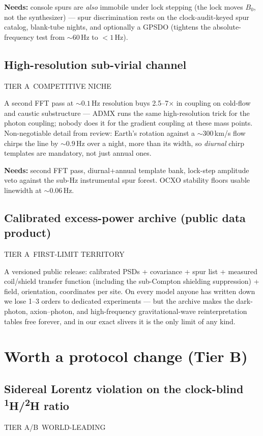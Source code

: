\documentclass[11pt]{article}
\newcommand{\chip}[3]{\colorbox{#1}{\textcolor{#2}{\scriptsize\textsf{\vphantom{Ag}#3}}}}
\newcommand{\cworld}[1]{\chip{goldsoft}{goldink}{#1}}
\newcommand{\cniche}[1]{\chip{accentsoft}{accentink}{#1}}
\newcommand{\cfirst}[1]{\chip{gatesoft}{gateink}{#1}}
\newcommand{\ctier}[1]{\chip{numbg}{inkfaint}{#1}}
\newcommand{\needs}[1]{{\small\textcolor{inkfaint}{\textbf{Needs:} #1}}}
\newcommand{\hnmr}{\textsuperscript{1}H}
\newcommand{\dnmr}{\textsuperscript{2}H}
\begin{document}
\needs{console spurs are \emph{also} immobile under lock stepping (the lock
moves $B_0$, not the synthesizer) --- spur discrimination rests on the
clock-audit-keyed spur catalog, blank-tube nights, and optionally a GPSDO
(tightens the absolute-frequency test from ${\sim}60$\,Hz to $<1$\,Hz).}

\subsection{High-resolution sub-virial channel}
\ctier{TIER A}\ \cniche{COMPETITIVE NICHE}

\medskip\noindent
A second FFT pass at ${\sim}0.1$\,Hz resolution buys 2.5--7$\times$ in coupling
on cold-flow and caustic substructure --- ADMX runs the same high-resolution
trick for the photon coupling; nobody does it for the gradient coupling at these
mass points. Non-negotiable detail from review: Earth's rotation against a
${\sim}300$\,km/s flow chirps the line by ${\sim}0.9$\,Hz over a night, more
than its width, so \emph{diurnal} chirp templates are mandatory, not just annual
ones.

\smallskip
\needs{second FFT pass, diurnal+annual template bank, lock-step amplitude veto
against the sub-Hz instrumental spur forest. OCXO stability floors usable
linewidth at ${\sim}0.06$\,Hz.}

\subsection{Calibrated excess-power archive (public data product)}
\ctier{TIER A}\ \cfirst{FIRST-LIMIT TERRITORY}

\medskip\noindent
A versioned public release: calibrated PSDs + covariance + spur list + measured
coil/shield transfer function (including the sub-Compton shielding suppression)
+ field, orientation, coordinates per site. On every model anyone has written
down we lose 1--3 orders to dedicated experiments --- but the archive makes the
dark-photon, axion--photon, and high-frequency gravitational-wave
reinterpretation tables free forever, and in our exact slivers it is the only
limit of any kind.

\section{Worth a protocol change (Tier B)}

\subsection{Sidereal Lorentz violation on the clock-blind \hnmr/\dnmr{} ratio}
\ctier{TIER A/B}\ \cworld{WORLD-LEADING}
\end{document}
